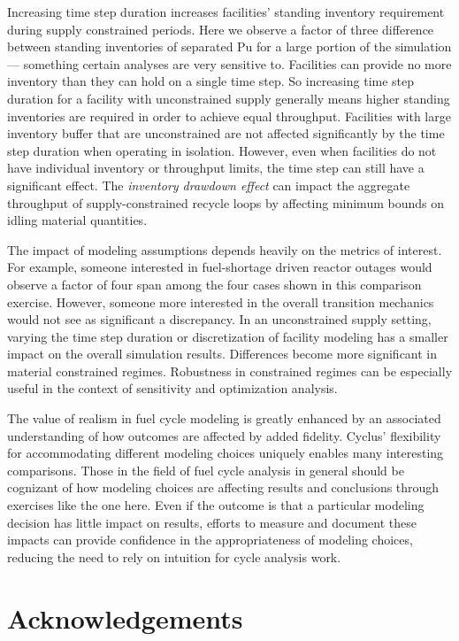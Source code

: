 \documentclass{style}
\begin{document}
Increasing time step duration increases facilities' standing inventory
requirement during supply constrained periods.  Here we observe a factor of
three difference between standing inventories of separated Pu for a large
portion of the simulation --- something certain analyses are very sensitive
to.  Facilities can provide no more inventory than they can hold on a single
time step.  So increasing time step duration for a facility with unconstrained
supply generally means higher standing inventories are required in order to
achieve equal throughput.  Facilities with large inventory buffer that are
unconstrained are not affected significantly by the time step duration when
operating in isolation.  However, even when facilities do not have individual
inventory or throughput limits, the time step can still have a significant
effect. The \emph{inventory drawdown effect} can impact the aggregate
throughput of supply-constrained recycle loops by affecting minimum bounds on
idling material quantities.

The impact of modeling assumptions depends heavily on the metrics of interest.
For example, someone interested in fuel-shortage driven reactor outages would
observe a factor of four span among the four cases shown in this comparison
exercise.  However, someone more interested in the overall transition
mechanics would not see as significant a discrepancy.  In an unconstrained
supply setting, varying the time step duration or discretization of facility
modeling has a smaller impact on the overall simulation results.
Differences become more significant in material constrained regimes.
Robustness in constrained regimes can be especially useful in the context of
sensitivity and optimization analysis.

The value of realism in fuel cycle modeling is greatly enhanced by an
associated understanding of how outcomes are affected by added fidelity.
Cyclus' flexibility for accommodating different modeling choices uniquely
enables many interesting comparisons.  Those in the field of fuel cycle
analysis in general should be cognizant of how modeling choices are affecting
results and conclusions through exercises like the one here.  Even if the
outcome is that a particular modeling decision has little impact on results,
efforts to measure and document these impacts can provide confidence in the
appropriateness of modeling choices, reducing the need to rely on intuition
for cycle analysis work.

\section{Acknowledgements}
\end{document}
